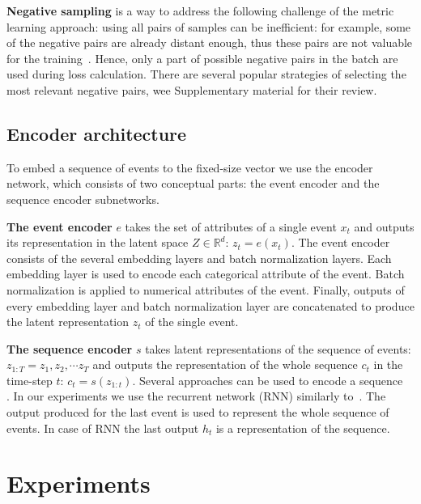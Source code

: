 \documentclass{article}
\newcommand{\R}{\mathbb{R}}
\begin{document}
\textbf{Negative sampling} is a way to address the following challenge of the metric learning approach: using all pairs of samples can be inefficient: for example, some of the negative pairs are already distant enough, thus these pairs are not valuable for the training~\cite{SimoSerra2015DiscriminativeLO, Manmatha2017SamplingMI, Schroff2015FaceNetAU}. Hence, only a part of possible negative pairs in the batch are used during loss calculation. There are several popular strategies of selecting the most relevant negative pairs, wee Supplementary material for their review. 

\subsection{Encoder architecture} \label{sec-enc-arch}

To embed a sequence of events to the fixed-size vector we use the encoder network, which consists of two conceptual parts: the event encoder and the sequence encoder subnetworks.

\textbf{The event encoder} $e$ takes the set of attributes of a single event $x_t$ and outputs its representation in the latent space $Z \in \R^d$: $z_t = e(x_t)$.
The event encoder consists of the several embedding layers and batch normalization layers. Each embedding layer is used to encode each categorical attribute of the event. Batch normalization is applied to numerical attributes of the event. Finally, outputs of every embedding layer and batch normalization layer are concatenated to produce the latent representation $z_t$ of the single event.

\textbf{The sequence encoder} $s$ takes latent representations of the sequence of events: $ z_{1:T} = z_1, z_2, \cdots z_T $ and outputs the representation of the whole sequence $c_t$ in the time-step $t$: $ c_t = s(z_{1:t}) $.
Several approaches can be used to encode a sequence~\cite{Cho2014LearningPR, Vaswani2017AttentionIA} . In our experiments we use the recurrent network (RNN) similarly to~\cite{Sutskever2014SequenceTS}. The output produced for the last event is used to represent the whole sequence of events. In case of RNN the last output $h_t$ is a representation of the sequence.

\section{Experiments} \label{sec-exp}
\end{document}
